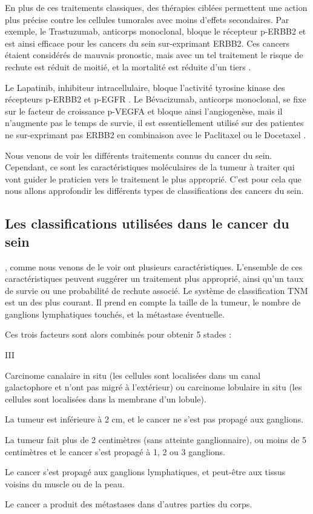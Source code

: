 			En plus de ces traitements classiques, des thérapies ciblées permettent une action plus précise contre les cellules tumorales avec moins d'effets secondaires.
			Par exemple, le Trastuzumab, anticorps monoclonal, bloque le récepteur \acs{p-ERBB2} et est ainsi efficace pour les cancers du sein sur-exprimant \acs{ERBB2}.
			Ces cancers étaient considérés de mauvais pronostic, mais avec un tel traitement le risque de rechute est réduit de moitié, et la mortalité est réduite d'un tiers \citep{Hudis2007}.

			Le Lapatinib, inhibiteur intracellulaire, bloque l'activité tyrosine kinase des récepteurs \acs{p-ERBB2} et \acs{p-EGFR} \citep{Burris2004,Higa2007}.
			Le Bévacizumab, anticorps monoclonal, se fixe sur le facteur de croissance \acs{p-VEGFA} et bloque ainsi l'angiogenèse, mais il n'augmente pas le temps de survie, il est essentiellement utilisé sur des patientes ne sur-exprimant pas \acs{ERBB2} en combinaison avec le Paclitaxel \citep{Miller2007a, Montero2012} ou le Docetaxel \citep{Miles2010}.

			Nous venons de voir les différents traitements connus du cancer du sein.
			Cependant, ce sont les caractéristiques moléculaires de la tumeur à traiter qui vont guider le praticien vers le traitement le plus approprié.
			C'est pour cela que nous allons approfondir les différents types de classifications des cancers du sein.

			\pagebreak

		\subsection{\textcolor{red!45!black}{Les classifications utilisées dans le cancer du sein}}
			, comme nous venons de le voir ont plusieurs caractéristiques.
			L'ensemble de ces caractéristiques peuvent suggérer un traitement plus approprié, ainsi qu'un taux de survie ou une probabilité de rechute associé.
			Le système de classification \ac{TNM} est un des plus courant.
			Il prend en compte la taille de la tumeur, le nombre de ganglions lymphatiques touchés, et la métastase éventuelle.

			Ces trois facteurs sont alors combinés pour obtenir 5 stades :
			\begin{mylist}{III}
				\item [0]   Carcinome canalaire in situ (les cellules sont localisées dans un canal galactophore et n'ont pas migré à l'extérieur) ou carcinome lobulaire in situ (les cellules sont localisées dans la membrane d'un lobule).
				\item [I]   La tumeur est inférieure à 2 cm, et le cancer ne s'est pas propagé aux ganglions.
				\item [II]  La tumeur fait plus de 2 centimètres (sans atteinte ganglionnaire), ou moins de 5 centimètres et le cancer s'est propagé à 1, 2 ou 3 ganglions.
				\item [III] Le cancer s'est propagé aux ganglions lymphatiques, et peut-être aux tissus voisins du muscle ou de la peau.
				\item [IV]  Le cancer a produit des métastases dans d'autres parties du corps.
			\end{mylist}

